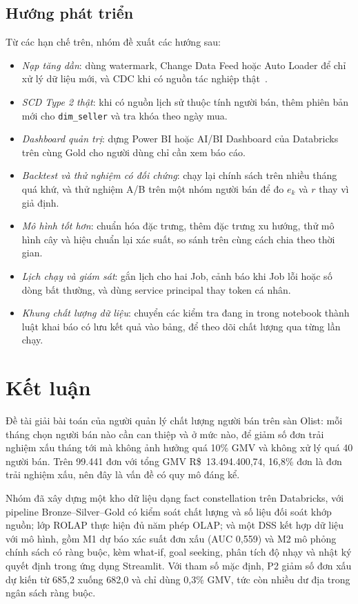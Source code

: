 \documentclass[a4paper]{article}
\begin{document}
\subsection{Hướng phát triển}
\label{subsec:6_4}

Từ các hạn chế trên, nhóm đề xuất các hướng sau:
\begin{itemize}
  \item \textit{Nạp tăng dần}: dùng watermark, Change Data Feed hoặc Auto Loader để chỉ xử lý dữ liệu mới, và CDC khi có nguồn tác nghiệp thật~\cite{bib:databricks}.
  \item \textit{SCD Type 2 thật}: khi có nguồn lịch sử thuộc tính người bán, thêm phiên bản mới cho \texttt{dim\_seller} và tra khóa theo ngày mua.
  \item \textit{Dashboard quản trị}: dựng Power BI hoặc AI/BI Dashboard của Databricks trên cùng Gold cho người dùng chỉ cần xem báo cáo.
  \item \textit{Backtest và thử nghiệm có đối chứng}: chạy lại chính sách trên nhiều tháng quá khứ, và thử nghiệm A/B trên một nhóm người bán để đo $e_k$ và $r$ thay vì giả định.
  \item \textit{Mô hình tốt hơn}: chuẩn hóa đặc trưng, thêm đặc trưng xu hướng, thử mô hình cây và hiệu chuẩn lại xác suất, so sánh trên cùng cách chia theo thời gian.
  \item \textit{Lịch chạy và giám sát}: gắn lịch cho hai Job, cảnh báo khi Job lỗi hoặc số dòng bất thường, và dùng service principal thay token cá nhân.
  \item \textit{Khung chất lượng dữ liệu}: chuyển các kiểm tra đang in trong notebook thành luật khai báo có lưu kết quả vào bảng, để theo dõi chất lượng qua từng lần chạy.
\end{itemize}

\section{Kết luận}
\label{sec:ch7}

Đề tài giải bài toán của người quản lý chất lượng người bán trên sàn Olist: mỗi tháng chọn người bán nào cần can thiệp và ở mức nào, để giảm số đơn trải nghiệm xấu tháng tới mà không ảnh hưởng quá 10\% GMV và không xử lý quá 40 người bán. Trên 99.441 đơn với tổng GMV R\$~13.494.400,74, 16,8\% đơn là đơn trải nghiệm xấu, nên đây là vấn đề có quy mô đáng kể.

Nhóm đã xây dựng một kho dữ liệu dạng fact constellation trên Databricks, với pipeline Bronze--Silver--Gold có kiểm soát chất lượng và số liệu đối soát khớp nguồn; lớp ROLAP thực hiện đủ năm phép OLAP; và một DSS kết hợp dữ liệu với mô hình, gồm M1 dự báo xác suất đơn xấu (AUC 0,559) và M2 mô phỏng chính sách có ràng buộc, kèm what-if, goal seeking, phân tích độ nhạy và nhật ký quyết định trong ứng dụng Streamlit. Với tham số mặc định, P2 giảm số đơn xấu dự kiến từ 685,2 xuống 682,0 và chỉ dùng 0,3\% GMV, tức còn nhiều dư địa trong ngân sách ràng buộc.
\end{document}
